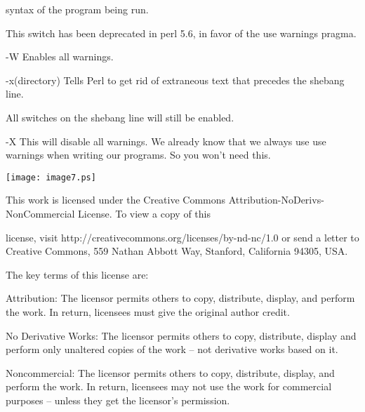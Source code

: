 \documentclass[a4paper,11pt]{book}
\begin{document}
\noindent syntax of the program being run.

\noindent 

\noindent This switch has been deprecated in perl 5.6, in favor of the  use warnings pragma.

\noindent 

\noindent -W Enables all warnings.

\noindent 

\noindent -x(directory) Tells Perl to get rid of extraneous text that precedes the shebang line.

\noindent All switches on the shebang line will still be enabled.

\noindent 

\noindent -X This will disable all warnings. We already know that we always use use warnings when writing our programs. So you won't need this.

\noindent  

\noindent  

\noindent  

\noindent  

\noindent 

\noindent \texttt{[image: image7.ps]}

\noindent 

\noindent This work is licensed under the Creative Commons Attribution-NoDerivs-NonCommercial License. To view a copy of this

\noindent license, visit http://creativecommons.org/licenses/by-nd-nc/1.0 or send a letter to Creative Commons, 559 Nathan Abbott Way, Stanford, California 94305, USA.

\noindent 

\noindent The key terms of this license are:

\noindent 

\noindent Attribution: The licensor permits others to copy, distribute, display, and perform the work. In return, licensees must give the original author credit.

\noindent 

\noindent No  Derivative  Works: The licensor permits others to copy, distribute, display and perform only unaltered copies of the work -- not derivative works based on it.

\noindent 

\noindent Noncommercial: The licensor permits others to copy, distribute, display, and perform the work. In return, licensees may not use the work for commercial purposes -- unless they get the licensor's permission.
\end{document}
